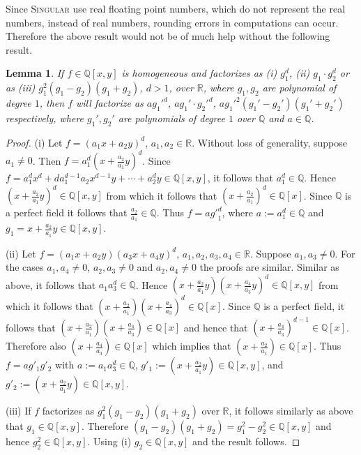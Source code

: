 \documentclass{amsproc}
\begin{document}
Since \textsc{Singular} use real floating point numbers, which do not represent
the real numbers, instead of real numbers, rounding errors in computations can
occur. Therefore the above result would not be of much help without the
following result. 
\newtheorem{x^3}[kjet]{Lemma}
\begin{x^3}\label{x^3}
If $f\in\mathbb Q[x,y]$ is homogeneous and factorizes as (i) $g_1^d$, (ii)
$g_1\cdot g_2^{d}$ or as  (iii) $g_1^2(g_1-g_2)(g_1+g_2)$, $d>1$, over $\mathbb
R$, where $g_1,g_2$ are polynomial of degree $1$, then $f$ will factorize as
$ag_1'^d$, $ag_1'\cdot g_2'^d$, $ag_1'^2(g_1'-g_2')(g_1'+g_2')$ respectively, where $g_1', g_2'$ are polynomials of degree $1$ over $\mathbb Q$ and $a\in\mathbb Q$.
\end{x^3}
\begin{proof}

(i) Let $f=(a_1x+a_2y)^d$, $a_1,a_2\in\mathbb R$. Without loss of generality,
suppose $a_1\neq 0$. Then $f=a_1^d(x+\frac{a_2}{a_1}y)^d$. Since $f=
a_1^dx^d+da_1^{d-1}a_2x^{d-1}y+\cdots+a_2^dy\in\mathbb Q[x,y]$, it follows that $a_1^d\in\mathbb Q$. Hence $(x+\frac{a_2}{a_1}y)^d\in\mathbb Q[x,y]$ from which it follows that $(x+\frac{a_2}{a_1})^d\in\mathbb Q[x]$. Since $\mathbb Q$ is a perfect field it follows that $\frac{a_2}{a_1}\in\mathbb Q$. Thus $f=a{g'}_1^d$, where $a:=a_1^d\in\mathbb Q$ and $g_1=x+\frac{a_2}{a_1}y\in\mathbb Q[x,y]$.

(ii) Let $f=(a_1x+a_2y)(a_3x+a_4y)^{d}$, $a_1,a_2,a_3,a_4\in\mathbb R$. Suppose $a_1,a_3\neq 0$.
For the cases $a_1,a_4\neq 0$, $a_2,a_3\neq 0$ and $a_2,a_4\neq 0$ the proofs are similar.
Similar as above, it follows that $a_1a_3^{d}\in\mathbb Q$. Hence $(x+\frac{a_2}{a_1}y)(x+\frac{a_4}{a_3}y)^d\in\mathbb Q[x,y]$ from which it follows that $(x+\frac{a_2}{a_1})(x+\frac{a_4}{a_3})^d\in\mathbb Q[x]$. Since $\mathbb Q$ is a perfect field, it follows that $(x+\frac{a_2}{a_1})(x+\frac{a_4}{a_3})\in\mathbb Q[x]$ and hence that $(x+\frac{a_4}{a_3})^{d-1}\in\mathbb Q[x]$. Therefore also $(x+\frac{a_4}{a_3})\in\mathbb Q[x]$ which implies that $(x+\frac{a_2}{a_1})\in\mathbb Q[x]$.
Thus $f=ag'_1g'_2$ with $a:=a_1a_3^d\in\mathbb Q$,
$g'_1:=(x+\frac{a_2}{a_1}y)\in\mathbb Q[x,y]$, and
$g'_2:=(x+\frac{a_2}{a_1}y)\in\mathbb Q[x,y]$.

(iii) If $f$ factorizes as $g_1^2(g_1-g_2)(g_1+g_2)$ over $\mathbb R$, it
follows similarly as above that $g_1\in\mathbb Q[x,y]$. Therefore $(g_1-g_2)(g_1+g_2)=g_1^2-g_2^2\in\mathbb Q[x,y]$ and hence $g_2^2\in\mathbb Q[x,y]$. Using (i) $g_2\in\mathbb Q[x,y]$ and the result follows.
\end{proof}
\end{document}
